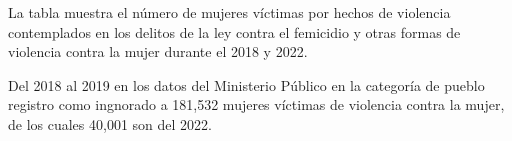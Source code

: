 La tabla muestra el número de mujeres víctimas por hechos de violencia contemplados en los delitos de la ley contra el femicidio y otras formas de violencia contra la mujer durante el 2018 y 2022. 

Del 2018 al 2019 en los datos del Ministerio Público en la categoría de pueblo registro como ingnorado a 181,532 mujeres víctimas de violencia contra la mujer, de los cuales 40,001 son del 2022. 